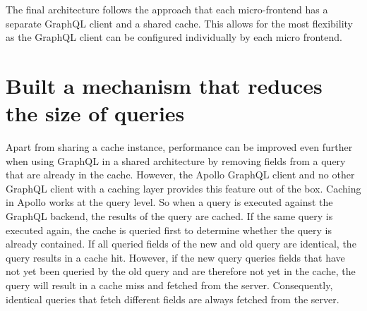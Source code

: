 \documentclass[MSE,Master,english]{twbook}%
\begin{document}
\ifshowUnusedContent
\fi

The final architecture follows the approach that each micro-frontend has a separate GraphQL client and a shared cache. This allows for the most flexibility as the GraphQL client can be configured individually by each micro frontend.


\ifshowUnusedContent

\fi

\section{Built a mechanism that reduces the size of queries}

Apart from sharing a cache instance, performance can be improved even further when using GraphQL in a shared architecture by removing fields from a query that are already in the cache.
However, the Apollo GraphQL client and no other GraphQL client with a caching layer provides this feature out of the box. Caching in Apollo works at the query level. So when a query is executed against the GraphQL backend, the results of the query are cached. If the same query is executed again, the cache is queried first to determine whether the query is already contained. If all queried fields of the new and old query are identical, the query results in a cache hit. However, if the new query queries fields that have not yet been queried by the old query and are therefore not yet in the cache, the query will result in a cache miss and fetched from the server. Consequently, identical queries that fetch different fields are always fetched from the server.
\end{document}
